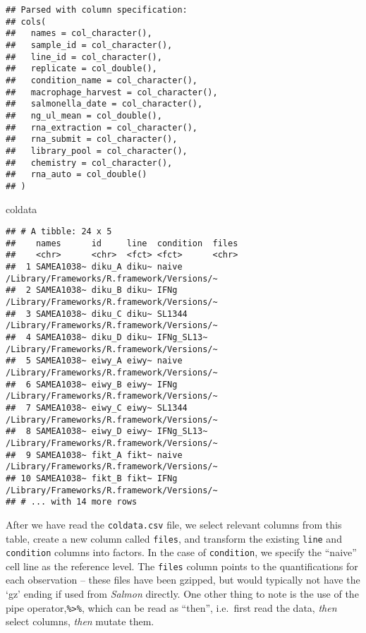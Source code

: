 \documentclass[
]{article}
\newenvironment{Shaded}{}{}
\newcommand{\NormalTok}[1]{#1}
\begin{document}
\begin{verbatim}
## Parsed with column specification:
## cols(
##   names = col_character(),
##   sample_id = col_character(),
##   line_id = col_character(),
##   replicate = col_double(),
##   condition_name = col_character(),
##   macrophage_harvest = col_character(),
##   salmonella_date = col_character(),
##   ng_ul_mean = col_double(),
##   rna_extraction = col_character(),
##   rna_submit = col_character(),
##   library_pool = col_character(),
##   chemistry = col_character(),
##   rna_auto = col_double()
## )
\end{verbatim}

\begin{Shaded}
\begin{Highlighting}[]
\NormalTok{coldata}
\end{Highlighting}
\end{Shaded}

\begin{verbatim}
## # A tibble: 24 x 5
##    names      id     line  condition  files                                     
##    <chr>      <chr>  <fct> <fct>      <chr>                                     
##  1 SAMEA1038~ diku_A diku~ naive      /Library/Frameworks/R.framework/Versions/~
##  2 SAMEA1038~ diku_B diku~ IFNg       /Library/Frameworks/R.framework/Versions/~
##  3 SAMEA1038~ diku_C diku~ SL1344     /Library/Frameworks/R.framework/Versions/~
##  4 SAMEA1038~ diku_D diku~ IFNg_SL13~ /Library/Frameworks/R.framework/Versions/~
##  5 SAMEA1038~ eiwy_A eiwy~ naive      /Library/Frameworks/R.framework/Versions/~
##  6 SAMEA1038~ eiwy_B eiwy~ IFNg       /Library/Frameworks/R.framework/Versions/~
##  7 SAMEA1038~ eiwy_C eiwy~ SL1344     /Library/Frameworks/R.framework/Versions/~
##  8 SAMEA1038~ eiwy_D eiwy~ IFNg_SL13~ /Library/Frameworks/R.framework/Versions/~
##  9 SAMEA1038~ fikt_A fikt~ naive      /Library/Frameworks/R.framework/Versions/~
## 10 SAMEA1038~ fikt_B fikt~ IFNg       /Library/Frameworks/R.framework/Versions/~
## # ... with 14 more rows
\end{verbatim}

After we have read the \texttt{coldata.csv} file, we select relevant columns from this
table, create a new column called \texttt{files}, and transform the existing \texttt{line}
and \texttt{condition} columns into factors. In the case of \texttt{condition}, we specify
the ``naive'' cell line as the reference level. The \texttt{files} column points to the
quantifications for each observation -- these files have been gzipped, but would
typically not have the `gz' ending if used from \emph{Salmon} directly. One other
thing to note is the use of the pipe operator,\texttt{\%\textgreater{}\%}, which can be read as
``then'', i.e.~first read the data, \emph{then} select columns, \emph{then} mutate them.
\end{document}
